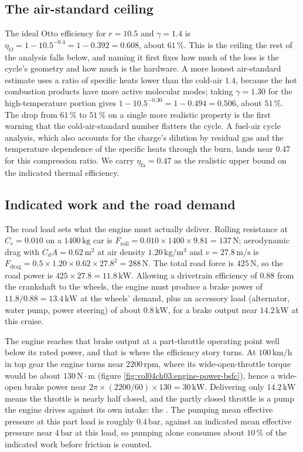 \subsection{The air-standard ceiling}

The ideal Otto efficiency for $r = 10.5$ and $\gamma = 1.4$ is
$\eta_O = 1 - 10.5^{-0.4} = 1 - 0.392 = 0.608$, about $61\,\%$. This is the
ceiling the rest of the analysis falls below, and naming it first fixes how
much of the loss is the cycle's geometry and how much is the hardware. A more
honest air-standard estimate uses a ratio of specific heats lower than the
cold-air $1.4$, because the hot combustion products have more active molecular
modes; taking $\gamma = 1.30$ for the high-temperature portion gives
$1 - 10.5^{-0.30} = 1 - 0.494 = 0.506$, about $51\,\%$. The drop from $61\,\%$
to $51\,\%$ on a single more realistic property is the first warning that the
cold-air-standard number flatters the cycle. A fuel-air cycle analysis, which
also accounts for the charge's dilution by residual gas and the temperature
dependence of the specific heats through the burn, lands near $0.47$ for this
compression ratio. We carry $\eta_{\text{fa}} = 0.47$ as the realistic
upper bound on the indicated thermal efficiency.

\subsection{Indicated work and the road demand}

The road load sets what the engine must actually deliver. Rolling resistance
at $C_r = 0.010$ on a $1400\,\text{kg}$ car is $F_{\text{roll}} = 0.010 \times
1400 \times 9.81 = 137\,\text{N}$; aerodynamic drag with $C_d A = 0.62\,
\text{m}^2$ at air density $1.20\,\text{kg}/\text{m}^3$ and
$v = 27.8\,\text{m}/\text{s}$ is $F_{\text{drag}} = 0.5 \times 1.20 \times
0.62 \times 27.8^2 = 288\,\text{N}$. The total road force is $425\,\text{N}$,
so the road power is $425 \times 27.8 = 11.8\,\text{kW}$. Allowing a
drivetrain efficiency of $0.88$ from the crankshaft to the wheels, the engine
must produce a brake power of $11.8/0.88 = 13.4\,\text{kW}$ at the wheels'
demand, plus an accessory load (alternator, water pump, power steering) of
about $0.8\,\text{kW}$, for a brake output near $14.2\,\text{kW}$ at this
cruise.

The engine reaches that brake output at a part-throttle operating point well
below its rated power, and that is where the efficiency story turns. At
$100\,\text{km}/\text{h}$ in top gear the engine turns near
$2200\,\text{rpm}$, where its wide-open-throttle torque would be about
$130\,\text{N}\cdot\text{m}$ (figure \ref{fig:vol04ch03:engine-power-bsfc}),
hence a wide-open brake power near $2\pi \times (2200/60) \times 130 =
30\,\text{kW}$. Delivering only $14.2\,\text{kW}$ means the throttle is nearly
half closed, and the partly closed throttle is a pump the engine drives
against its own intake: the . The pumping mean effective
pressure at this part load is roughly $0.4\,\text{bar}$, against an indicated
mean effective pressure near $4\,\text{bar}$ at this load, so pumping alone
consumes about $10\,\%$ of the indicated work before friction is counted.

